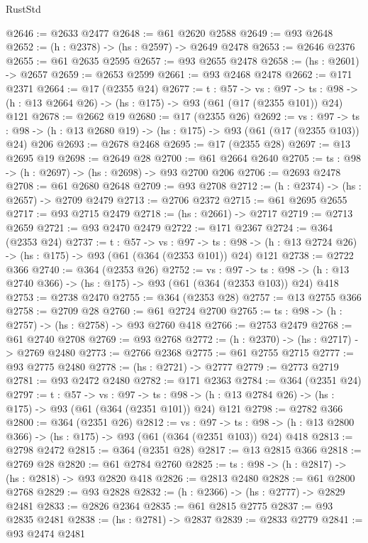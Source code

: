 \begin{lexlean}{RustStd}
\begin{coremodule}
@2646 := @2633 @2477
@2648 := @61 @2620 @2588
@2649 := @93 @2648
@2652 := (h : @2378) -> (hs : @2597) -> @2649 @2478
@2653 := @2646 @2376
@2655 := @61 @2635 @2595
@2657 := @93 @2655 @2478
@2658 := (hs : @2601) -> @2657
@2659 := @2653 @2599
@2661 := @93 @2468 @2478
@2662 := @171 @2371
@2664 := @17 (@2355 @24)
@2677 := {t : @57} ->
  {vs : @97} ->
  {ts : @98} -> (h : @13 @2664 @26) -> (hs : @175) -> @93 (@61 (@17 (@2355 @101)) @24) @121
@2678 := @2662 @19
@2680 := @17 (@2355 @26)
@2692 := {vs : @97} ->
  {ts : @98} -> (h : @13 @2680 @19) -> (hs : @175) -> @93 (@61 (@17 (@2355 @103)) @24) @206
@2693 := @2678 @2468
@2695 := @17 (@2355 @28)
@2697 := @13 @2695 @19
@2698 := @2649 @28
@2700 := @61 @2664 @2640
@2705 := {ts : @98} -> (h : @2697) -> (hs : @2698) -> @93 @2700 @206
@2706 := @2693 @2478
@2708 := @61 @2680 @2648
@2709 := @93 @2708
@2712 := (h : @2374) -> (hs : @2657) -> @2709 @2479
@2713 := @2706 @2372
@2715 := @61 @2695 @2655
@2717 := @93 @2715 @2479
@2718 := (hs : @2661) -> @2717
@2719 := @2713 @2659
@2721 := @93 @2470 @2479
@2722 := @171 @2367
@2724 := @364 (@2353 @24)
@2737 := {t : @57} ->
  {vs : @97} ->
  {ts : @98} -> (h : @13 @2724 @26) -> (hs : @175) -> @93 (@61 (@364 (@2353 @101)) @24) @121
@2738 := @2722 @366
@2740 := @364 (@2353 @26)
@2752 := {vs : @97} ->
  {ts : @98} -> (h : @13 @2740 @366) -> (hs : @175) -> @93 (@61 (@364 (@2353 @103)) @24) @418
@2753 := @2738 @2470
@2755 := @364 (@2353 @28)
@2757 := @13 @2755 @366
@2758 := @2709 @28
@2760 := @61 @2724 @2700
@2765 := {ts : @98} -> (h : @2757) -> (hs : @2758) -> @93 @2760 @418
@2766 := @2753 @2479
@2768 := @61 @2740 @2708
@2769 := @93 @2768
@2772 := (h : @2370) -> (hs : @2717) -> @2769 @2480
@2773 := @2766 @2368
@2775 := @61 @2755 @2715
@2777 := @93 @2775 @2480
@2778 := (hs : @2721) -> @2777
@2779 := @2773 @2719
@2781 := @93 @2472 @2480
@2782 := @171 @2363
@2784 := @364 (@2351 @24)
@2797 := {t : @57} ->
  {vs : @97} ->
  {ts : @98} -> (h : @13 @2784 @26) -> (hs : @175) -> @93 (@61 (@364 (@2351 @101)) @24) @121
@2798 := @2782 @366
@2800 := @364 (@2351 @26)
@2812 := {vs : @97} ->
  {ts : @98} -> (h : @13 @2800 @366) -> (hs : @175) -> @93 (@61 (@364 (@2351 @103)) @24) @418
@2813 := @2798 @2472
@2815 := @364 (@2351 @28)
@2817 := @13 @2815 @366
@2818 := @2769 @28
@2820 := @61 @2784 @2760
@2825 := {ts : @98} -> (h : @2817) -> (hs : @2818) -> @93 @2820 @418
@2826 := @2813 @2480
@2828 := @61 @2800 @2768
@2829 := @93 @2828
@2832 := (h : @2366) -> (hs : @2777) -> @2829 @2481
@2833 := @2826 @2364
@2835 := @61 @2815 @2775
@2837 := @93 @2835 @2481
@2838 := (hs : @2781) -> @2837
@2839 := @2833 @2779
@2841 := @93 @2474 @2481

\end{coremodule}
\end{lexlean}

